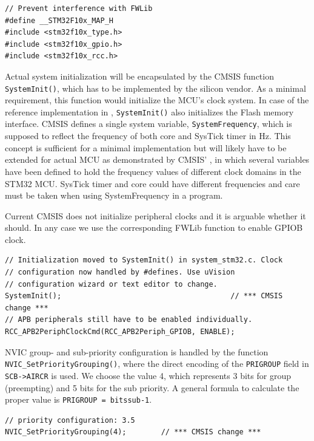 \begin{lstlisting}[style=cpp]
// Prevent interference with FWLib
#define __STM32F10x_MAP_H
#include <stm32f10x_type.h>
#include <stm32f10x_gpio.h>
#include <stm32f10x_rcc.h>
\end{lstlisting}

Actual system initialization will be encapsulated by the CMSIS function
\verb|SystemInit()|, which has to be implemented by the silicon vendor. As a
minimal requirement, this function would initialize the MCU’s clock system. In
case of the reference implementation in ,
\verb|SystemInit()| also initializes the Flash memory interface. CMSIS defines a
single system variable, \verb|SystemFrequency|, which is supposed to reflect the
frequency of both core and SysTick timer in Hz. This concept is sufficient for a
minimal implementation but will likely have to be extended for actual MCU as
demonstrated by CMSIS’ , in which several variables have
been defined to hold the frequency values of different clock domains in the
STM32 MCU. SysTick timer and core could have different frequencies and care must
be taken when using SystemFrequency in a program.

Current CMSIS does not initialize peripheral clocks and it is arguable whether
it should. In any case we use the corresponding FWLib function to enable GPIOB
clock.

\begin{lstlisting}[style=cpp]
// Initialization moved to SystemInit() in system_stm32.c. Clock
// configuration now handled by #defines. Use uVision
// configuration wizard or text editor to change.
SystemInit(); 										// *** CMSIS change ***
// APB peripherals still have to be enabled individually.
RCC_APB2PeriphClockCmd(RCC_APB2Periph_GPIOB, ENABLE);
\end{lstlisting}

NVIC group- and sub-priority configuration is handled by the function
\verb|NVIC_SetPriorityGrouping()|, where the direct encoding of the
\verb|PRIGROUP| field in \verb|SCB->AIRCR| is used. We choose the value 4, which
represents 3 bits for group (preempting) and 5 bits for the sub priority. A
general formula to calculate the proper value is \verb|PRIGROUP = bitssub-1|.

\begin{lstlisting}[style=cpp]
// priority configuration: 3.5
NVIC_SetPriorityGrouping(4); 		// *** CMSIS change ***
\end{lstlisting}

